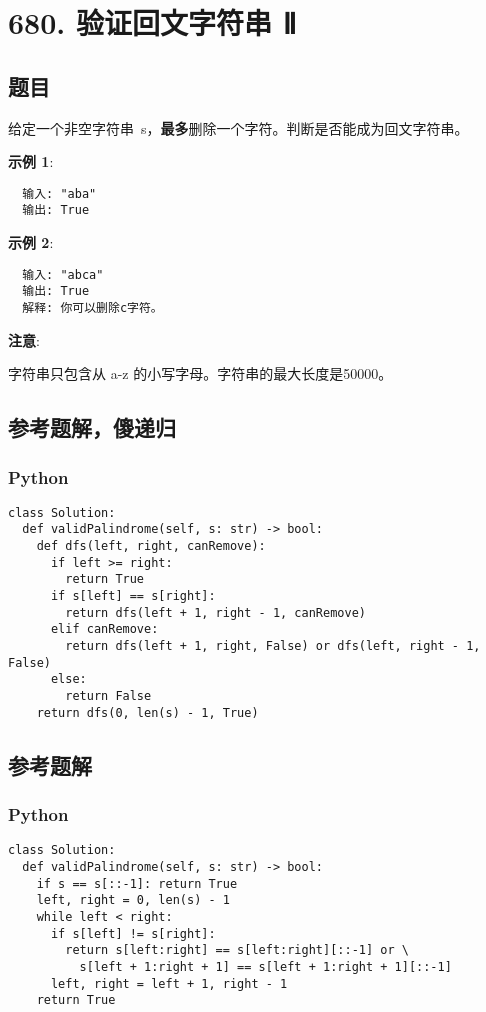 \newpage
\section{680. 验证回文字符串 Ⅱ}
\label{leetcode:680}

\subsection{题目}

给定一个非空字符串 s，\textbf{最多}删除一个字符。判断是否能成为回文字符串。

\textbf{示例 1}:

\begin{verbatim}
  输入: "aba"
  输出: True
\end{verbatim}

\textbf{示例 2}:

\begin{verbatim}
  输入: "abca"
  输出: True
  解释: 你可以删除c字符。
\end{verbatim}

\textbf{注意}:

字符串只包含从 a-z 的小写字母。字符串的最大长度是50000。

\subsection{参考题解，傻递归}

\subsubsection{Python}

\begin{verbatim}
class Solution:
  def validPalindrome(self, s: str) -> bool:
    def dfs(left, right, canRemove):
      if left >= right:
        return True
      if s[left] == s[right]:
        return dfs(left + 1, right - 1, canRemove)
      elif canRemove:
        return dfs(left + 1, right, False) or dfs(left, right - 1, False)
      else:
        return False
    return dfs(0, len(s) - 1, True)
\end{verbatim}

\subsection{参考题解}

\subsubsection{Python}

\begin{verbatim}
class Solution:
  def validPalindrome(self, s: str) -> bool:
    if s == s[::-1]: return True
    left, right = 0, len(s) - 1
    while left < right:
      if s[left] != s[right]:
        return s[left:right] == s[left:right][::-1] or \
          s[left + 1:right + 1] == s[left + 1:right + 1][::-1]
      left, right = left + 1, right - 1
    return True
\end{verbatim}
